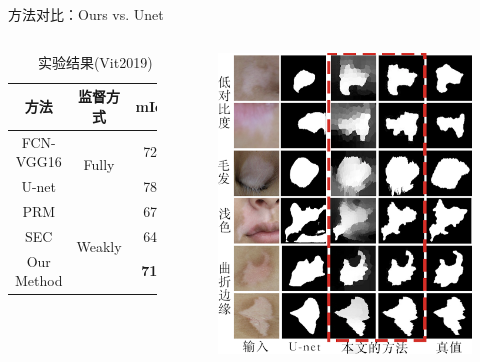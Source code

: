\begin{frame}{方法对比：Ours vs. Unet}
\begin{columns}[c]
\begin{table}
  \caption{实验结果(Vit2019)}
    \begin{tabular}{c|c|c}
    \toprule
   方法 & 监督方式 & mIoU \\
    \hline
    \hline
    FCN-VGG16  & \multirow{2}[2]{*}{Fully} & 72.4 \\
    U-net &       & 78.6 \\
    \hline
    PRM  & \multirow{3}[2]{*}{Weakly} & 67.2 \\
    SEC  &       & 64.7 \\
    Our Method &       &\textbf{71.4}\\
    \bottomrule
    \end{tabular}%
\end{table}%

\begin{figure}
    \centering
    \includegraphics[width=\linewidth]{figures/unetcompareSmaller.png}
\end{figure}
\end{columns}
\end{frame}

